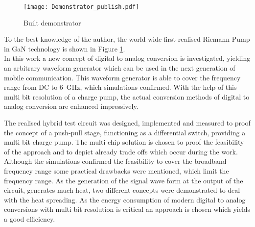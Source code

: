 \begin{figure}[h]
	\centering
  \texttt{[image: Demonstrator\_publish.pdf]}
	\caption{Built demonstrator}
	\label{fig:Demonstrator}
\end{figure}
To the best knowledge of the author, the world wide first realised Riemann Pump in GaN technology is shown in Figure \ref{fig:Demonstrator}.\\

In this work a new concept of digital to analog conversion is investigated, yielding an arbitrary waveform generator which can be used in the next generation of mobile communication.
This waveform generator is able to cover the frequency range from DC to \SI{6}{\giga \hertz}, which simulations confirmed.
With the help of this multi bit resolution of a charge pump, the actual conversion methods of digital to analog conversion are enhanced impressively.


The realised hybrid test circuit was designed, implemented and measured to proof the concept of a push-pull stage, functioning as a differential switch, providing a multi bit charge pump.
The multi chip solution is chosen to proof the feasibility of the approach and to depict already trade offs which occur during the work.\\
Although the simulations confirmed the feasibility to cover the broadband frequency range some practical drawbacks were mentioned, which limit the frequency range.
As the generation of the signal wave form at the output of the circuit, generates much heat, two different concepts were demonstrated to deal with the heat spreading.
As the energy consumption of modern digital to analog conversions with multi bit resolution is critical an approach is chosen which yields a good efficiency.



